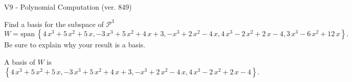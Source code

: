 \begin{exercise}
  \begin{exerciseTitle}V9 - Polynomial Computation (ver. 849)\end{exerciseTitle}
  \begin{exerciseStatement}
    Find a basis for the subspace of \(\mathcal{P}^3\) 
\[W=\mathrm{span}\ \left\{4 \, x^{3} + 5 \, x^{2} + 5 \, x , -3 \, x^{3} + 5 \, x^{2} + 4 \, x + 3 , -x^{3} + 2 \, x^{2} - 4 \, x , 4 \, x^{3} - 2 \, x^{2} + 2 \, x - 4 , 3 \, x^{3} - 6 \, x^{2} + 12 \, x\right\}.\]
 Be sure to explain why your result is a basis.


  \end{exerciseStatement}
  \begin{exerciseAnswer}
   A basis of \(W\) is  \(\left\{4 \, x^{3} + 5 \, x^{2} + 5 \, x , -3 \, x^{3} + 5 \, x^{2} + 4 \, x + 3 , -x^{3} + 2 \, x^{2} - 4 \, x , 4 \, x^{3} - 2 \, x^{2} + 2 \, x - 4\right\}\).
  


  \end{exerciseAnswer}
\end{exercise}